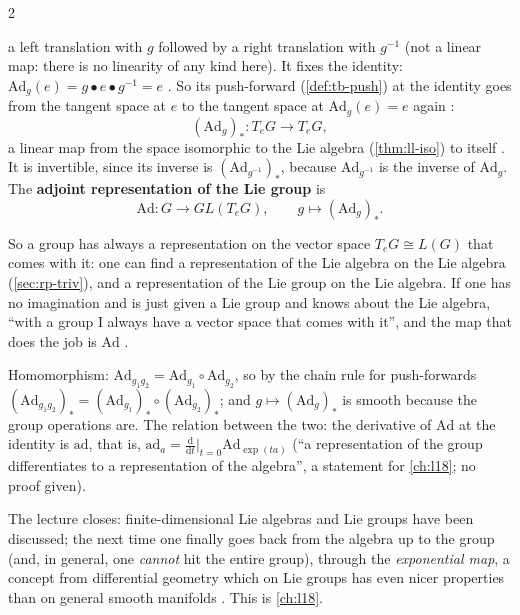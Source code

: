\begin{paracol}{2}
\begin{definition}
\[\]
a left translation with $g$ followed by a right translation with $g^{-1}$ (not a linear map: there is no linearity of any kind here).    It fixes the identity: $\mathrm{Ad}_g(e)=g\bullet e\bullet g^{-1}=e$  . So its push-forward (\cref{def:tb-push}) at the identity goes from the tangent space at $e$ to the tangent space at $\mathrm{Ad}_g(e)=e$ again   :
\[
  (\mathrm{Ad}_g)_*\colon T_eG\to T_eG ,
\]
a linear map from the space isomorphic to the Lie algebra (\cref{thm:ll-iso}) to itself . It is invertible, since its inverse is $(\mathrm{Ad}_{g^{-1}})_*$, because $\mathrm{Ad}_{g^{-1}}$ is the inverse of $\mathrm{Ad}_g$. The \textbf{adjoint representation of the Lie group} is
\[
  \mathrm{Ad}\colon G\to GL(T_eG),\qquad g\mapsto(\mathrm{Ad}_g)_* .
\]
   
\end{definition}
So a group has always a representation on the vector space $T_eG\cong L(G)$ that comes with it: one can find a representation of the Lie algebra on the Lie algebra (\cref{sec:rp-triv}), and a representation of the Lie group on the Lie algebra. If one has no imagination and is just given a Lie group and knows about the Lie algebra, ``with a group I always have a vector space that comes with it'', and the map that does the job is $\mathrm{Ad}$   .
\begin{coursenote}
Homomorphism: $\mathrm{Ad}_{g_1g_2}=\mathrm{Ad}_{g_1}\circ\mathrm{Ad}_{g_2}$, so by the chain rule for push-forwards $(\mathrm{Ad}_{g_1g_2})_*=(\mathrm{Ad}_{g_1})_*\circ(\mathrm{Ad}_{g_2})_*$; and $g\mapsto(\mathrm{Ad}_g)_*$ is smooth because the group operations are. The relation between the two: the derivative of $\mathrm{Ad}$ at the identity is $\mathrm{ad}$, that is, $\mathrm{ad}_a=\frac{\mathrm d}{\mathrm dt}\big|_{t=0}\mathrm{Ad}_{\exp(ta)}$ (``a representation of the group differentiates to a representation of the algebra'', a statement for \cref{ch:l18}; no proof given). 
\end{coursenote}
The lecture closes: finite-dimensional Lie algebras and Lie groups have been discussed; the next time one finally goes back from the algebra up to the group (and, in general, one \emph{cannot} hit the entire group), through the \emph{exponential map}, a concept from differential geometry which on Lie groups has even nicer properties than on general smooth manifolds   . This is \cref{ch:l18}.


\end{paracol}
